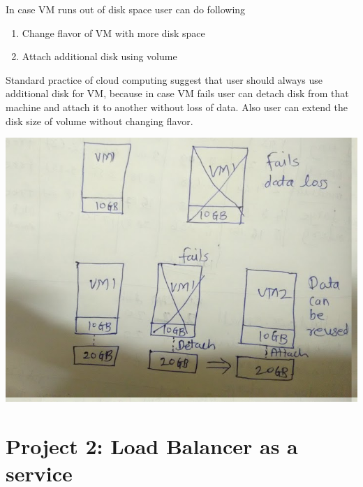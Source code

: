 \documentclass[letterpaper,10pt,english]{sphinxmanual}
\begin{document}
In case VM runs out of disk space user can do following
\begin{enumerate}
\item {} 
Change flavor of VM with more disk space

\item {} 
Attach additional disk using volume

\end{enumerate}

Standard practice of cloud computing suggest that user should always use additional disk for VM, because in case VM fails user can detach disk from that machine and attach it to another without loss of data. Also user can extend the disk size of volume without changing flavor.

\includegraphics{vm_resize_problem.jpg}


\section{Project 2: Load Balancer as a service}
\label{_source/projects/project2::doc}\label{_source/projects/project2:project-2-load-balancer-as-a-service}
\end{document}
